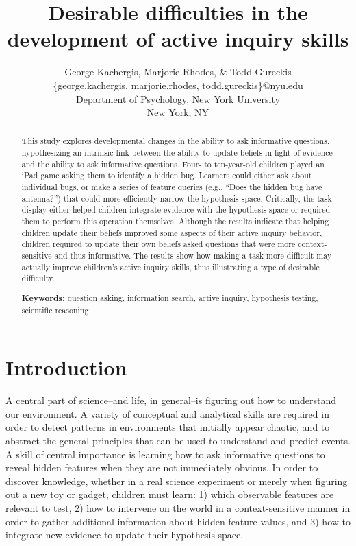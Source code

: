 \documentclass[man,floatsintext]{apa6}
\title{Desirable difficulties in the development of active inquiry skills}
\author{
 George Kachergis, Marjorie Rhodes, \& Todd Gureckis \\
  \{george.kachergis, marjorie.rhodes, todd.gureckis\}@nyu.edu \\
  Department of Psychology, New York University \\
  New York, NY
}
\begin{document}
\maketitle

\begin{abstract}

This study explores developmental changes in the ability to ask 
informative questions, hypothesizing an intrinsic link between the ability to 
update beliefs in light of evidence and the ability to ask informative questions. 
Four- to ten-year-old children 
played an iPad game asking them to identify a hidden bug. Learners could either 
ask about individual bugs, or make a series of feature queries (e.g., ``Does the 
hidden bug have antenna?'') that could more efficiently narrow the hypothesis 
space. Critically, the task display either helped children integrate evidence 
with the hypothesis space or required them to perform this operation themselves.  Although the results 
indicate that helping children update their beliefs improved some aspects of their active 
inquiry behavior, children required to update their own beliefs asked questions that 
were more context-sensitive and thus informative.  The results show how making a 
task more difficult may actually improve children's active inquiry skills, thus 
illustrating a type of desirable difficulty.

\textbf{Keywords:} 
question asking, information search, active inquiry, hypothesis testing, scientific 
reasoning
\end{abstract}


\section{Introduction} 

A central part of science--and life, in general--is figuring out how to understand our environment. 
A variety of conceptual and analytical skills are required in order to detect patterns in 
environments that initially appear chaotic, and to abstract the general principles that can 
be used to understand and predict events. A skill of central importance is learning how to ask 
informative questions to reveal hidden features when they are not immediately obvious.
In order to discover knowledge, whether in a real science experiment or 
merely when figuring out a new toy or gadget, children must learn: 1) which 
observable features are relevant to test, 2) how to intervene on the world in a 
context-sensitive manner in order to gather additional information about hidden 
feature values, and 3) how to integrate new evidence to update their hypothesis space.
\end{document}

